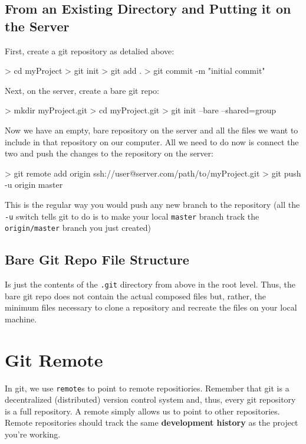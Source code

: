 \documentclass[10pt,letterpaper]{article}
\begin{document}
\subsection{From an Existing Directory and Putting it on the Server}

First, create a git repository as detalied above:
\begin{code}
> cd myProject
> git init
> git add .
> git commit -m "initial commit"
\end{code}

\noindent Next, on the server, create a bare git repo:
\begin{code}
> mkdir myProject.git
> cd myProject.git
> git init --bare --shared=group
\end{code}

\noindent Now we have an empty, bare repository on the server and all the files we want to include in that repository on our computer. All we need to do now is connect the two and push the changes to the repository on the server:

\begin{code}
> git remote add origin ssh://user@server.com/path/to/myProject.git
> git push -u origin master
\end{code}
This is the regular way you would push any new branch to the repository (all the \texttt{-u} switch tells git to do is to make your local \texttt{master} branch track the \texttt{origin/master} branch you just created)


\subsection{Bare Git Repo File Structure}

Is just the contents of the \texttt{.git} directory from above in the root level. Thus, the bare git repo does not contain the actual composed files but, rather, the minimum files necessary to clone a repository and recreate the files on your local machine.

\section{Git Remote}

In git, we use \texttt{remote}s to point to remote repositiories. Remember that git is a decentralized (distributed) version control system and, thus, every git repository is a full repository. A remote simply allows us to point to other repositories. Remote repositories should track the same \textbf{development history} as the project you're working.
\end{document}
